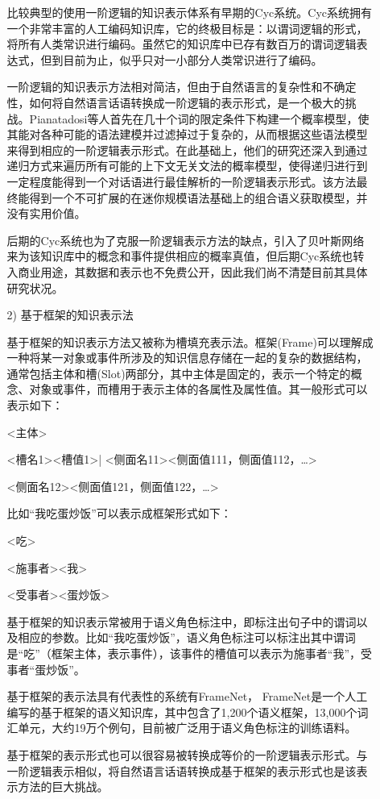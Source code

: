 \begin{enumerate}
\begin{enumerate}
比较典型的使用一阶逻辑的知识表示体系有早期的Cyc系统\cite{Lenat1990}。Cyc系统拥有一个非常丰富的人工编码知识库，它的终极目标是：以谓词逻辑的形式，将所有人类常识进行编码。虽然它的知识库中已存有数百万的谓词逻辑表达式，但到目前为止，似乎只对一小部分人类常识进行了编码。

一阶逻辑的知识表示方法相对简洁，但由于自然语言的复杂性和不确定性，如何将自然语言话语转换成一阶逻辑的表示形式，是一个极大的挑战。Pianatadosi等人\cite{Piantadosi2008}首先在几十个词的限定条件下构建一个概率模型，使其能对各种可能的语法建模并过滤掉过于复杂的，从而根据这些语法模型来得到相应的一阶逻辑表示形式。在此基础上，他们的研究还深入到通过递归方式来遍历所有可能的上下文无关文法的概率模型，使得递归进行到一定程度能得到一个对话语进行最佳解析的一阶逻辑表示形式。该方法最终能得到一个不可扩展的在迷你规模语法基础上的组合语义获取模型，并没有实用价值。

后期的Cyc系统也为了克服一阶逻辑表示方法的缺点，引入了贝叶斯网络来为该知识库中的概念和事件提供相应的概率真值，但后期Cyc系统也转入商业用途，其数据和表示也不免费公开，因此我们尚不清楚目前其具体研究状况。

\item[2)] 基于框架的知识表示法

基于框架的知识表示方法又被称为槽填充表示法。框架(Frame)可以理解成一种将某一对象或事件所涉及的知识信息存储在一起的复杂的数据结构，通常包括主体和槽(Slot)两部分，其中主体是固定的，表示一个特定的概念、对象或事件，而槽用于表示主体的各属性及属性值。其一般形式可以表示如下：

       <主体>  

       <槽名1><槽值1>| <侧面名11><侧面值111，侧面值112，…>

                                    <侧面名12><侧面值121，侧面值122，…>

比如“我吃蛋炒饭”可以表示成框架形式如下：

       <吃>  

       <施事者><我>

       <受事者><蛋炒饭>


基于框架的知识表示常被用于语义角色标注中，即标注出句子中的谓词以及相应的参数。比如“我吃蛋炒饭”，语义角色标注可以标注出其中谓词是“吃”（框架主体，表示事件），该事件的槽值可以表示为施事者“我”，受事者“蛋炒饭”。

基于框架的表示法具有代表性的系统有FrameNet\cite{Atkins1995}， FrameNet是一个人工编写的基于框架的语义知识库，其中包含了1,200个语义框架，13,000个词汇单元，大约19万个例句，目前被广泛用于语义角色标注的训练语料。

基于框架的表示形式也可以很容易被转换成等价的一阶逻辑表示形式。与一阶逻辑表示相似，将自然语言话语转换成基于框架的表示形式也是该表示方法的巨大挑战。


\end{enumerate}
\end{enumerate}
